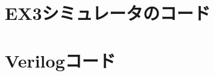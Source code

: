 \documentclass{jsarticle}
\begin{document}
\section*{EX3シミュレータのコード}





\section*{Verilogコード}




\end{document}
